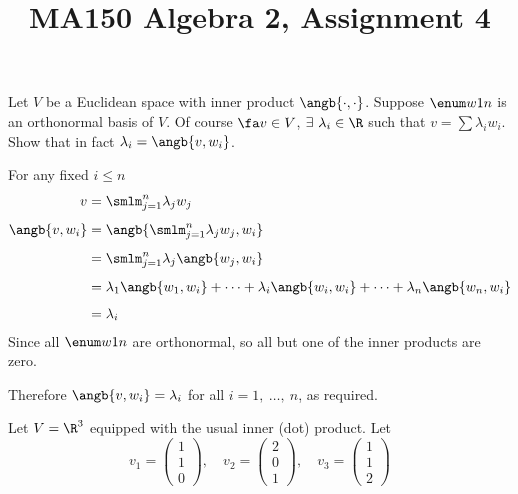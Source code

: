\documentclass[a4paper]{article}
\title{MA150 Algebra 2, Assignment 4}
\begin{document}
\maketitle

\setlength{\parindent}{0em}
\setlength{\parskip}{1em}


\begin{questionbody}
Let $V$ be a Euclidean space with inner product $\angb{\cdot, \cdot}$. Suppose $\enum w1n$ is an orthonormal basis of $V$. Of course $\fa v \in V$, $\exists\ \lambda_i \in \R$ such that $v = \sum \lambda_i w_i$. Show that in fact $\lambda_i = \angb{v, w_i}$.
\end{questionbody}

For any fixed $i \le n$ \begin{align*}
v &= \smlm_{j=1}^n \lambda_j w_j\\[1ex]
\angb{v, w_i} &= \angb{\smlm_{j=1}^n \lambda_j w_j, w_i}\\[1ex]
&= \smlm_{j=1}^n \lambda_j \angb{w_j, w_i}\\[1ex]
&= \lambda_1 \angb{w_1, w_i} + \cdots + \lambda_i \angb{w_i, w_i} + \cdots + \lambda_n \angb{w_n, w_i}\\[1ex]
&= \lambda_i
\end{align*}
Since all $\enum w1n$ are orthonormal, so all but one of the inner products are zero.

Therefore $\angb{v, w_i} = \lambda_i$ for all $i = 1,\ \ldots,\ n$, as required.


\begin{questionbody}
Let $V = \R^3$ equipped with the usual inner (dot) product. Let $$v_1 = \begin{pmatrix}1\\ 1\\ 0\end{pmatrix}, \quad v_2 = \begin{pmatrix}2\\ 0\\ 1\end{pmatrix}, \quad v_3 = \begin{pmatrix}1\\ 1\\ 2\end{pmatrix}$$
\end{questionbody}

\subsection{~} %
\end{document}
